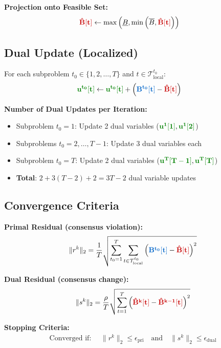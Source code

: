 \documentclass[11pt]{article}
\newcommand{\blueB}[1]{\textcolor{bluevar}{\mathbf{#1}}}      %
\newcommand{\redBhat}[1]{\textcolor{redvar}{\mathbf{#1}}}     %
\newcommand{\greenu}[1]{\textcolor{greenvar}{\mathbf{#1}}}    %
\begin{document}
\textbf{Projection onto Feasible Set:}
\begin{align}
\redBhat{\hat{B}[t]} &\leftarrow \max\left( \underline{B}, \min\left( \overline{B}, \redBhat{\hat{B}[t]} \right) \right)
\end{align}

\subsection{Dual Update (Localized)}

For each subproblem $t_0 \in \{1, 2, \ldots, T\}$ and $t \in \mathcal{T}_{\text{local}}^{t_0}$:
\begin{align}
\greenu{u^{t_0}[t]} &\leftarrow \greenu{u^{t_0}[t]} + \left( \blueB{B^{t_0}[t]} - \redBhat{\hat{B}[t]} \right)
\end{align}

\textbf{Number of Dual Updates per Iteration:}
\begin{itemize}
    \item Subproblem $t_0 = 1$: Update 2 dual variables ($\greenu{u^{1}[1]}, \greenu{u^{1}[2]}$)
    \item Subproblems $t_0 = 2, \ldots, T-1$: Update 3 dual variables each
    \item Subproblem $t_0 = T$: Update 2 dual variables ($\greenu{u^{T}[T-1]}, \greenu{u^{T}[T]}$)
    \item \textbf{Total}: $2 + 3(T-2) + 2 = 3T - 2$ dual variable updates
\end{itemize}

\subsection{Convergence Criteria}

\textbf{Primal Residual (consensus violation):}
\begin{align}
\|r^k\|_2 = \frac{1}{T} \sqrt{ \sum_{t_0=1}^T \sum_{t \in \mathcal{T}_{\text{local}}^{t_0}} \left( \blueB{B^{t_0}[t]} - \redBhat{\hat{B}[t]} \right)^2 }
\end{align}

\textbf{Dual Residual (consensus change):}
\begin{align}
\|s^k\|_2 = \frac{\rho}{T} \sqrt{ \sum_{t=1}^T \left( \redBhat{\hat{B}^k[t]} - \redBhat{\hat{B}^{k-1}[t]} \right)^2 }
\end{align}

\textbf{Stopping Criteria:}
\begin{align}
\text{Converged if: } \quad \|r^k\|_2 \leq \epsilon_{\text{pri}} \quad \text{and} \quad \|s^k\|_2 \leq \epsilon_{\text{dual}}
\end{align}
\end{document}
